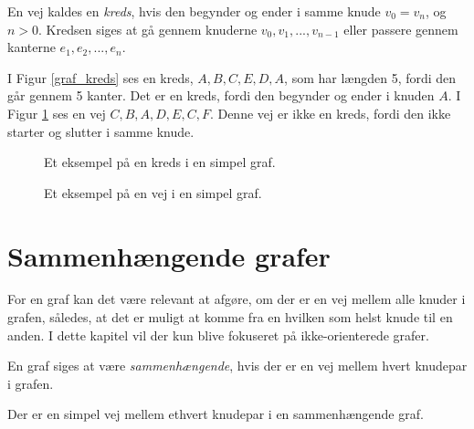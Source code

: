 \begin{defn}
\label{def_kredse}
En vej kaldes en \textit{kreds}, hvis den begynder og ender i samme knude $v_0=v_n$, og $n>0$.
Kredsen siges at gå gennem knuderne $v_0,v_1,...,v_{n-1}$ eller passere gennem kanterne $e_1, e_2,..., e_n$.
\end{defn}

\begin{exmp}
I Figur \ref{graf_kreds} ses en kreds, $A,B,C,E,D,A$, som har længden 5, fordi den går gennem 5 kanter. Det er en kreds, fordi den begynder og ender i knuden $A$.
I Figur \ref{graf_ikke_kreds} ses en vej $C,B,A,D,E,C,F$.
Denne vej er ikke en kreds, fordi den ikke starter og slutter i samme knude. 
\end{exmp}

\begin{figure}[!htb]
   \begin{minipage}{0.48\textwidth}
     \centering
		 
     \caption{Et eksempel på en kreds i en simpel graf.}
     \label{graf_kreds}
   \end{minipage}\hfill
   \begin{minipage}{0.48\textwidth}
     \centering
		 
     \caption{Et eksempel på en vej i en simpel graf.}
     \label{graf_ikke_kreds}
   \end{minipage}
\end{figure}

\section{Sammenhængende grafer}
For en graf kan det være relevant at afgøre, om der er en vej mellem alle knuder i grafen, således, at det er muligt at komme fra en hvilken som helst knude til en anden.
I dette kapitel vil der kun blive fokuseret på ikke-orienterede grafer.

\begin{defn}
\label{def_iosmh}
En graf siges at være \textit{sammenhængende}, hvis der er en vej mellem hvert knudepar i grafen. 
\end{defn}


\begin{thm}
Der er en simpel vej mellem ethvert knudepar i en sammenhængende graf.
\label{smh_satning}
\end{thm}

